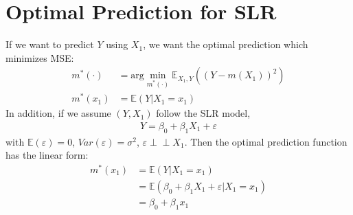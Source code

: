 \documentclass{article}
\newcommand{\indep}{\perp \!\!\! \perp}
\newcommand{\E}{\mathbb{E}}
\newcommand{\argmin}{\text{arg}\min}
\begin{document}
\section{Optimal Prediction for SLR}
If we want to predict $Y$ using $X_1$, we want the optimal prediction which minimizes MSE:
\begin{align}
    m^*(\cdot) &= \argmin_{m^*(\cdot)} \E_{X_1,Y}((Y - m(X_1))^2)\\
    m^*(x_1) &= \E(Y|X_1 = x_1) 
\end{align}
In addition, if we assume $(Y, X_1)$ follow the SLR model,
\begin{align}
    Y = \beta_0 + \beta_1X_1 + \varepsilon
\end{align}
with $\E(\varepsilon) = 0$, $Var(\varepsilon) = \sigma^2$, $\varepsilon \indep X_1$. Then the optimal prediction function has the linear form:
\begin{align}
    m^*(x_1) &= \E(Y|X_1 = x_1)\\
    &= \E(\beta_0 + \beta_1X_1 + \varepsilon | X_1 = x_1)\\
    &= \beta_0 + \beta_1 x_1
\end{align}
\end{document}
